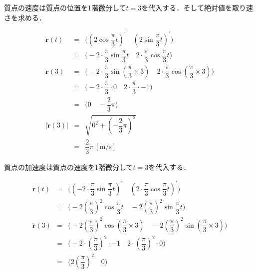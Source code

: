 \documentclass[a4paper,11pt]{ltjsarticle}
\begin{document}
\begin{enumerate}
\begin{enumerate}[label=\roman*.]
\clearpage

    質点の速度は質点の位置を1階微分して$t=3$を代入する．そして絶対値を取り速さを求める．


    \renewcommand{\arraystretch}{3.5}
    \begin{equation}
      \begin{array}{rcl}
        \dot{\bm{r}}(t) &=& \Bigg(\left(2\cos\dfrac{\pi}{3}t\right)^{\prime} \quad \left(2\sin\dfrac{\pi}{3}t\right)^{\prime}\Bigg) \\
        &=& \Bigg(-2 \cdot \dfrac{\pi}{3}\sin\dfrac{\pi}{3}t \quad 2 \cdot \dfrac{\pi}{3}\cos\dfrac{\pi}{3}t\Bigg) \\
        \dot{\bm{r}}(3) &=& \Bigg(-2 \cdot \dfrac{\pi}{3}\sin\left(\dfrac{\pi}{3} \times 3\right) \quad 2 \cdot \dfrac{\pi}{3}\cos\left(\dfrac{\pi}{3} \times 3\right)\Bigg) \\
        &=& \Bigg(-2 \cdot \dfrac{\pi}{3} \cdot 0 \quad 2 \cdot \dfrac{\pi}{3} \cdot -1\Bigg) \\
        &=& \Bigg(0 \quad -\dfrac{2}{3}\pi\Bigg) \\
        |\dot{\bm{r}}(3)| &=& \sqrt{0^2 + \left(-\dfrac{2}{3}\pi\right)^2} \\
        &=& \dfrac{2}{3}\pi\ [\mathrm{m/s}]
      \end{array}
    \end{equation}

    質点の加速度は質点の速度を1階微分して$t=3$を代入する．


    \renewcommand{\arraystretch}{3.5}
    \begin{equation}
      \begin{array}{rcl}
        \ddot{\bm{r}}(t) &=& \Bigg(\left(-2 \cdot \dfrac{\pi}{3}\sin\dfrac{\pi}{3}t\right)^{\prime} \quad \left(2 \cdot \dfrac{\pi}{3}\cos\dfrac{\pi}{3}t\right)^{\prime}\Bigg) \\
        &=& \Bigg(-2 \left(\dfrac{\pi}{3}\right)^2\cos\dfrac{\pi}{3}t \quad -2 \left(\dfrac{\pi}{3}\right)^2 \sin\dfrac{\pi}{3}t\Bigg) \\
        \ddot{\bm{r}}(3) &=& \Bigg(-2 \left(\dfrac{\pi}{3}\right)^2\cos\left(\dfrac{\pi}{3} \times 3\right) \quad -2 \left(\dfrac{\pi}{3}\right)^2 \sin\left(\dfrac{\pi}{3} \times 3\right)\Bigg) \\
        &=& \Bigg(-2 \cdot \left(\dfrac{\pi}{3}\right)^2 \cdot -1 \quad 2 \cdot \left(\dfrac{\pi}{3}\right)^2 \cdot 0\Bigg) \\
        &=& \Bigg(2 \left(\dfrac{\pi}{3}\right)^2 \quad 0\Bigg) \\
      \end{array}
    \end{equation}


\end{enumerate}
\end{enumerate}
\end{document}

